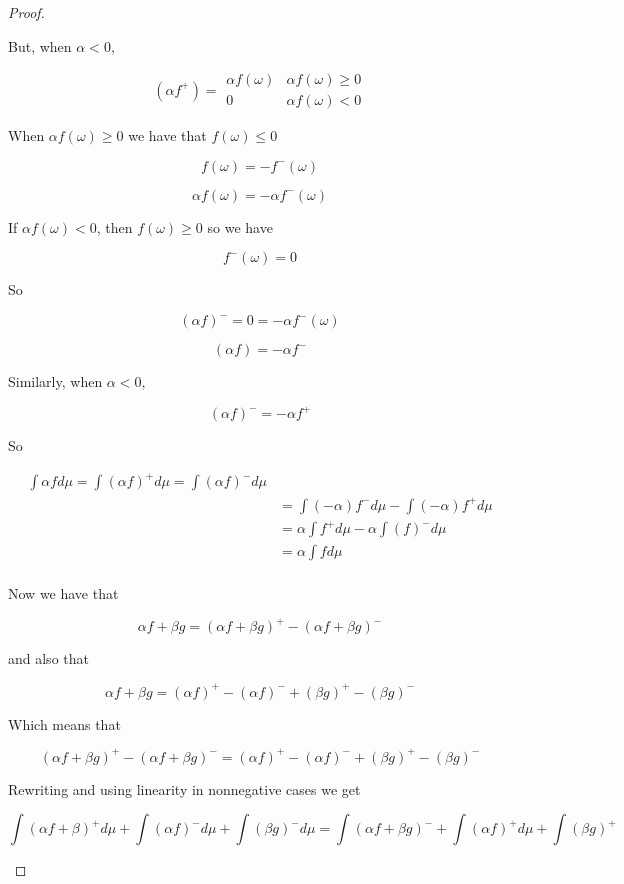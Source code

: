 \documentclass[11pt,fleqn]{book} %
\begin{document}
\begin{proof}
\begin{enumerate}
			But, when $\alpha < 0$, 

					$$ (\alpha f^+) = \begin{array}{ll}
						\alpha f(\omega) & \alpha f(\omega) \geq 0\\
						0 & \alpha f(\omega) < 0
					\end{array} $$

			When $\alpha f(\omega) \geq 0$ we have that $f(\omega) \leq 0$

					$$f(\omega) = -f^-(\omega) $$

					$$\alpha f(\omega) = - \alpha f^-(\omega) $$

			If $\alpha f(\omega) < 0$, then $f(\omega) \geq 0$ so we have

					$$f^-(\omega) = 0 $$

			So

					$$(\alpha f)^- = 0 = -\alpha f^-(\omega) $$

					$$(\alpha f) = - \alpha f^- $$


			Similarly, when $\alpha < 0$, 

					$$ (\alpha f)^- = - \alpha f^+ $$

			So 

					\begin{align*}
						\int \alpha f d\mu = \int (\alpha f)^+ d\mu = \int (\alpha f)^- d\mu\\
								&= \int (-\alpha) f^- d\mu - \int (-\alpha) f^+ d\mu\\
								&= \alpha \int f^+ d\mu - \alpha \int (f)^- d\mu\\
								&= \alpha \int f d\mu\\
					\end{align*}


			Now we have that

					$$\alpha f + \beta g = (\alpha f + \beta g)^+ - (\alpha f + \beta g)^- $$

			and also that 

					$$\alpha f + \beta g = (\alpha f)^+ - (\alpha f)^- + (\beta g)^+ - (\beta g)^- $$

			Which means that 

				$$(\alpha f + \beta g)^+ - (\alpha f + \beta g)^- = (\alpha f)^+ - (\alpha f)^- + (\beta g)^+ - (\beta g)^-$$

			Rewriting and using linearity in nonnegative cases we get

					$$\int (\alpha f + \beta)^+ d\mu + \int (\alpha f)^- d\mu + \int (\beta g)^- d\mu = \int (\alpha f + \beta g)^- + \int(\alpha f)^+ d\mu + \int (\beta g)^+ $$

	\end{enumerate}
\end{proof}
\end{document}
